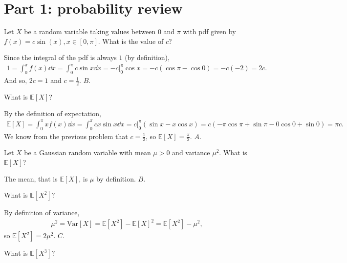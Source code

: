 \documentclass[a4paper]{article}
\begin{document}
\section{Part 1: probability review}
\begin{Exercise}
	Let $X$ be a random variable taking values between $0$ and $\pi$ with pdf given by $f(x) = c\sin(x), x \in [0, \pi].$ What is the value of $c$?
\end{Exercise}
\begin{Solution}
	Since the integral of the pdf is always $1$ (by definition),
	\begin{align*}
		1 = \int_{0}^{\pi} f(x) \dd{x} = \int_{0}^{\pi} c \sin x \dd{x} = -c \Big|_{0}^{\pi} \cos x = -c (\cos \pi - \cos 0) = -c (-2) = 2c. 
	\end{align*}
	And so, $2c = 1$ and $c = \frac{1}{2}$. $\boxed{B}$.
\end{Solution}
\begin{Exercise}
	What is $\mathbb{E}[X]$?
\end{Exercise}
\begin{Solution}
	By the definition of expectation, 
	\begin{align*}
		\mathbb{E}[X] = \int_{0}^{\pi} x f(x) \dd{x} = \int_0^{\pi} c x \sin x \dd{x} = c \Big|_0^{\pi} \left( \sin x - x \cos x \right) = c (-\pi \cos \pi + \sin \pi - 0 \cos 0 + \sin 0) = \pi c.
	\end{align*}
	We know from the previous problem that $c = \frac{1}{2}$, so $\mathbb{E}[X] = \frac{\pi}{2}.$ $\boxed{A}$.
\end{Solution}
\begin{Exercise}
	Let $X$ be a Gaussian random variable with mean $\mu >0$ and variance $\mu^2$. What is $\mathbb{E}[X]$?
\end{Exercise}
\begin{Solution}
	The mean, that is $\mathbb{E}[X]$, is $\mu$ by definition. $\boxed{B}$.
\end{Solution}
\begin{Exercise}
	What is $\mathbb{E}[X^2]$?
\end{Exercise}
\begin{Solution}
	By definition of variance,
	\begin{align*}
		\mu^2 = \text{Var}[X] = \mathbb{E}[X^2] - \mathbb{E}[X]^2 = \mathbb{E}[X^2] - \mu^2,
	\end{align*}
	so $\mathbb{E}[X^2] = 2 \mu^2.$ $\boxed{C}$.
\end{Solution}
\begin{Exercise}
	What is $\mathbb{E}[X^3]$?
\end{Exercise}
\end{document}
